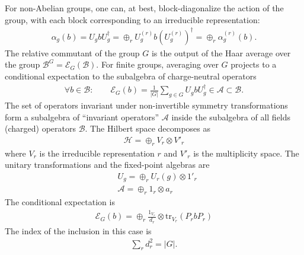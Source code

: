 \documentclass{article}
\newcommand{\Tr}{\mathrm{tr}}
\newcommand{\mA}{\mathcal{A}}
\newcommand{\mB}{\mathcal{B}}
\newcommand{\mH}{\mathcal{H}}
\newcommand{\mE}{\mathcal{E}}
\newcommand{\nn}{\nonumber}
\theoremstyle{definition}
\begin{document}
For non-Abelian groups, one can, at best, block-diagonalize the action of the group, with each block corresponding to an irreducible representation:
\begin{align}
   \alpha_g(b)=U_g b U_g^\dagger=\oplus_r U_g^{(r)}b (U_g^{(r)})^\dagger=\oplus_r \alpha_g^{(r)}(b).
\end{align}
The relative commutant of the group $G$ is the output of the Haar average over the group
$\mathcal{B}^G=\mathcal{E}_G(\mathcal{B})$. 
For finite groups, averaging over $G$ projects to a conditional expectation to
  the subalgebra of charge-neutral operators
  \begin{align}
    \forall b\in \mB:\qquad \mE_{G}(b)=\frac{1}{|G|}\sum_{g\in G}U_{g}b U_{g}^{\dagger}\in \mA\subset \mB.
  \end{align}
  The set of operators invariant under non-invertible symmetry transformations form
  a subalgebra of ``invariant operators'' $\mathcal{A}$ inside the subalgebra of
  all fields (charged) operators $\mathcal{B}$. The Hilbert space decomposes as
  \begin{align}
    \mH=\oplus_{r}V_{r}\otimes V'_{r}
  \end{align}
  where $V_{r}$ is the irreducible representation $r$ and $V'_{r}$ is the
  multiplicity space. The unitary transformations and the fixed-point algebras are
  \begin{align}
     & U_{g}=\oplus_{r}U_{r}(g)\otimes 1'_{r}\nn \\
     & \mA=\oplus_{r}1_{r}\otimes a_{r}
  \end{align}
  The conditional expectation is
  \begin{align}
    \mE_{G}(b)=\oplus_{r}\frac{1_{V_r}}{d_{r}}\otimes \Tr_{V_r}(P_{r}b P_{r})
  \end{align}
  The index of the inclusion in this case is
  \begin{align}
    \sum_{r} d_{r}^{2}=|G|.
  \end{align}
\end{document}
